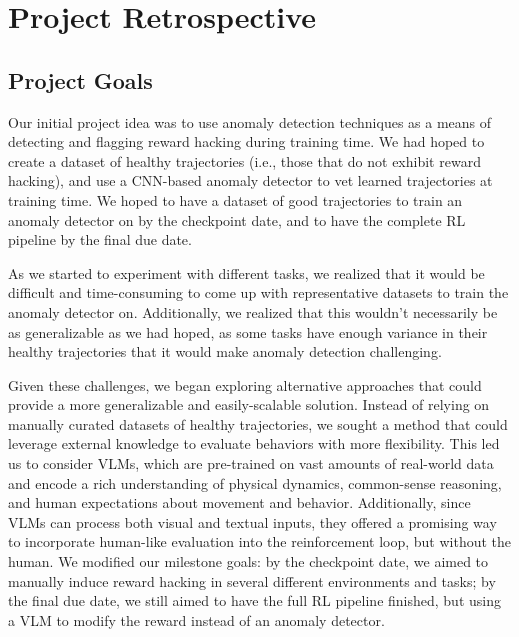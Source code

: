 \documentclass{article}
\begin{document}
\section{Project Retrospective}
\subsection{Project Goals}
Our initial project idea was to use anomaly detection techniques as a means of detecting and flagging reward hacking during training time. We had hoped to create a dataset of healthy trajectories (i.e., those that do not exhibit reward hacking), and use a CNN-based anomaly detector to vet learned trajectories at training time. We hoped to have a dataset of good trajectories to train an anomaly detector on by the checkpoint date, and to have the complete RL pipeline by the final due date.

As we started to experiment with different tasks, we realized that it would be difficult and time-consuming to come up with representative datasets to train the anomaly detector on. Additionally, we realized that this wouldn't necessarily be as generalizable as we had hoped, as some tasks have enough variance in their healthy trajectories that it would make anomaly detection challenging. 

Given these challenges, we began exploring alternative approaches that could provide a more generalizable and easily-scalable solution. Instead of relying on manually curated datasets of healthy trajectories, we sought a method that could leverage external knowledge to evaluate behaviors with more flexibility. This led us to consider VLMs, which are pre-trained on vast amounts of real-world data and encode a rich understanding of physical dynamics, common-sense reasoning, and human expectations about movement and behavior. Additionally, since VLMs can process both visual and textual inputs, they offered a promising way to incorporate human-like evaluation into the reinforcement loop, but without the human. We modified our milestone goals: by the checkpoint date, we aimed to manually induce reward hacking in several different environments and tasks; by the final due date, we still aimed to have the full RL pipeline finished, but using a VLM to modify the reward instead of an anomaly detector.
\end{document}
